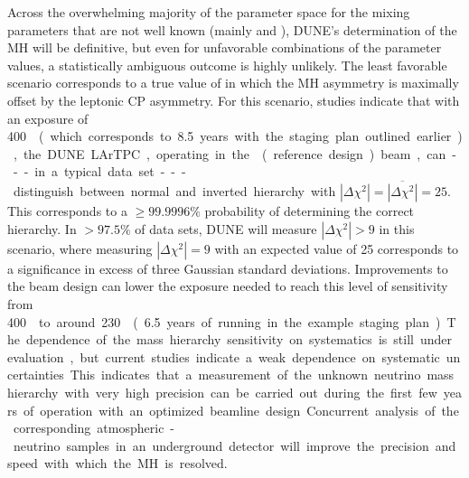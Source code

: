 Across the overwhelming majority of the parameter space for the mixing
parameters that are not well known (mainly \deltacp and ),
DUNE's determination of the MH will be definitive, but even for
unfavorable combinations of the parameter values, a statistically
ambiguous outcome is highly unlikely.  The least favorable scenario
corresponds to a true value of \deltacp in which the MH asymmetry is
maximally offset by the leptonic CP asymmetry.  
For this %
scenario, studies indicate that with an exposure of \SI{400}\ktMWyr{}  (which corresponds to \num{8.5} years with the staging plan outlined
earlier), the DUNE LArTPC, operating in the  
(reference design) beam, can --- in a typical data set --- distinguish
between normal and inverted hierarchy with $|\Delta \chi^2| =
\overline{|\Delta \chi^2|} = 25$.  This corresponds to a $\geq
99.9996\%$ probability of determining the correct hierarchy.  In
$>97.5\%$ of data sets, DUNE will measure $|\Delta \chi^2| > 9$ in
this scenario, where measuring $|\Delta\chi^2| = 9$ with an expected
value of \num{25} corresponds to a significance in excess of three
Gaussian standard deviations. Improvements to the beam design can
lower the exposure needed to reach this level of sensitivity from
\SI{400}\ktMWyr{} to around \SI{230}\ktMWyr{} (\num{6.5} years of
running in the example staging plan). The dependence of the mass
hierarchy sensitivity on systematics is still under evaluation, but
current studies indicate a weak dependence on systematic
uncertainties. This indicates that a measurement of the unknown
neutrino mass hierarchy with very high precision can be carried out
during the first few years of operation with an optimized beamline
design.

Concurrent analysis of the corresponding atmospheric-neutrino samples
in an underground detector will improve the precision and speed with
which the MH is resolved.


